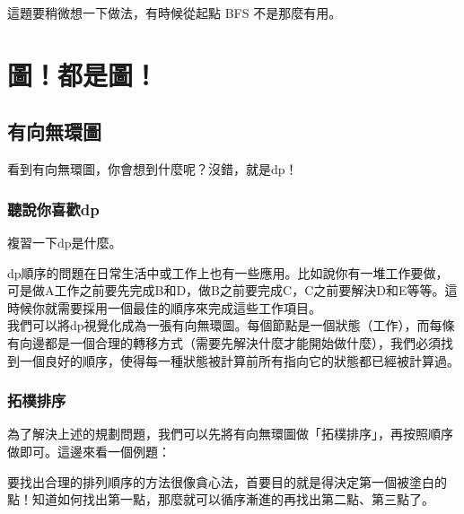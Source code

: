 
這題要稍微想一下做法，有時候從起點 BFS 不是那麼有用。

\chapter{圖！都是圖！}

\section{有向無環圖}

看到有向無環圖，你會想到什麼呢？沒錯，就是dp！

\subsection{聽說你喜歡dp}
複習一下dp是什麼。

dp順序的問題在日常生活中或工作上也有一些應用。比如說你有一堆工作要做，可是做A工作之前要先完成B和D，做B之前要完成C，C之前要解決D和E等等。這時候你就需要採用一個最佳的順序來完成這些工作項目。\\

我們可以將dp視覺化成為一張有向無環圖。每個節點是一個狀態（工作），而每條有向邊都是一個合理的轉移方式（需要先解決什麼才能開始做什麼），我們必須找到一個良好的順序，使得每一種狀態被計算前所有指向它的狀態都已經被計算過。\\

\subsection{拓樸排序}
為了解決上述的規劃問題，我們可以先將有向無環圖做「拓樸排序」，再按照順序做即可。這邊來看一個例題：\\


要找出合理的排列順序的方法很像貪心法，首要目的就是得決定第一個被塗白的點！知道如何找出第一點，那麼就可以循序漸進的再找出第二點、第三點了。\\

